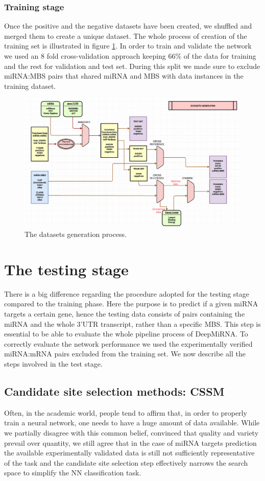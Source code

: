 \subsubsection{Training stage}
Once the positive and the negative datasets have been created, we shuffled and merged them to create a unique dataset. The whole process of creation of the training set is illustrated in figure \ref{fig:training}. In order to train and validate the network we used an 8 fold cross-validation approach keeping 66\% of the data for training and the rest for validation and test set. During this split we made sure to exclude miRNA:MBS pairs that shared miRNA and MBS with data instances in the training dataset.

\begin{figure}[hbt!]
	\centering
	\includegraphics[width=1\textwidth]{Figures/training}
	\caption{The datasets generation process.}
	\label{fig:training}
\end{figure}

\section{The testing stage}
There is a big difference regarding the procedure adopted for the testing stage compared to the training phase. Here the purpose is to predict if a given miRNA targets a certain gene, hence the testing data consists of pairs containing the miRNA and the whole 3'UTR transcript, rather than a specific MBS. This step is essential to be able to evaluate the whole pipeline process of DeepMiRNA. To correctly evaluate the network performance we used the experimentally verified miRNA:mRNA pairs excluded from the training set. We now describe all the steps involved in the test stage. 

\subsection{Candidate site selection methods: CSSM}
Often, in the academic world, people tend to affirm that, in order to properly train a neural network, one needs to have a huge amount of data available. While we partially disagree with this common belief, convinced that quality and variety prevail over quantity, we still agree that in the case of miRNA targets prediction the available experimentally validated data is still not sufficiently representative of the task and the candidate site selection step effectively narrows the search space to simplify the NN classification task.

